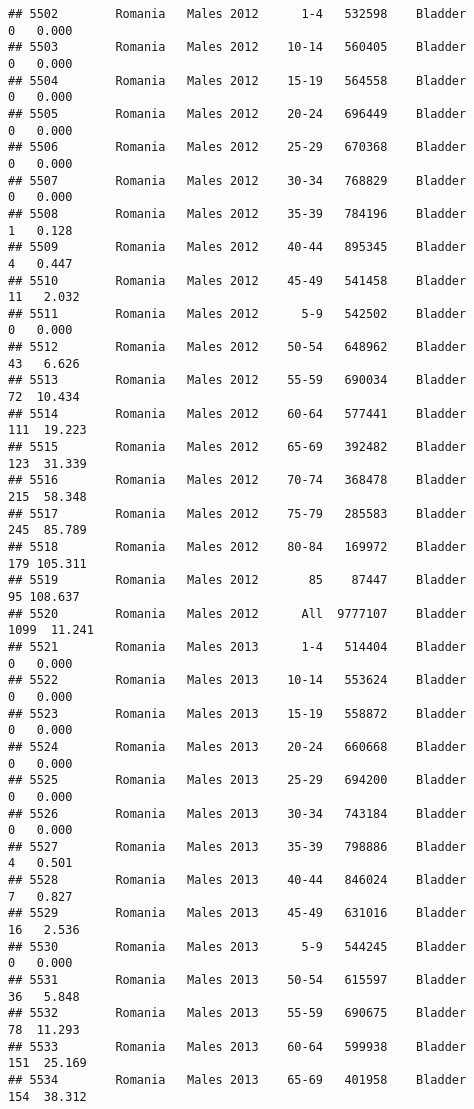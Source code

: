 \documentclass[
]{article}
\begin{document}
\begin{verbatim}
## 5502        Romania   Males 2012      1-4   532598    Bladder      0   0.000
## 5503        Romania   Males 2012    10-14   560405    Bladder      0   0.000
## 5504        Romania   Males 2012    15-19   564558    Bladder      0   0.000
## 5505        Romania   Males 2012    20-24   696449    Bladder      0   0.000
## 5506        Romania   Males 2012    25-29   670368    Bladder      0   0.000
## 5507        Romania   Males 2012    30-34   768829    Bladder      0   0.000
## 5508        Romania   Males 2012    35-39   784196    Bladder      1   0.128
## 5509        Romania   Males 2012    40-44   895345    Bladder      4   0.447
## 5510        Romania   Males 2012    45-49   541458    Bladder     11   2.032
## 5511        Romania   Males 2012      5-9   542502    Bladder      0   0.000
## 5512        Romania   Males 2012    50-54   648962    Bladder     43   6.626
## 5513        Romania   Males 2012    55-59   690034    Bladder     72  10.434
## 5514        Romania   Males 2012    60-64   577441    Bladder    111  19.223
## 5515        Romania   Males 2012    65-69   392482    Bladder    123  31.339
## 5516        Romania   Males 2012    70-74   368478    Bladder    215  58.348
## 5517        Romania   Males 2012    75-79   285583    Bladder    245  85.789
## 5518        Romania   Males 2012    80-84   169972    Bladder    179 105.311
## 5519        Romania   Males 2012       85    87447    Bladder     95 108.637
## 5520        Romania   Males 2012      All  9777107    Bladder   1099  11.241
## 5521        Romania   Males 2013      1-4   514404    Bladder      0   0.000
## 5522        Romania   Males 2013    10-14   553624    Bladder      0   0.000
## 5523        Romania   Males 2013    15-19   558872    Bladder      0   0.000
## 5524        Romania   Males 2013    20-24   660668    Bladder      0   0.000
## 5525        Romania   Males 2013    25-29   694200    Bladder      0   0.000
## 5526        Romania   Males 2013    30-34   743184    Bladder      0   0.000
## 5527        Romania   Males 2013    35-39   798886    Bladder      4   0.501
## 5528        Romania   Males 2013    40-44   846024    Bladder      7   0.827
## 5529        Romania   Males 2013    45-49   631016    Bladder     16   2.536
## 5530        Romania   Males 2013      5-9   544245    Bladder      0   0.000
## 5531        Romania   Males 2013    50-54   615597    Bladder     36   5.848
## 5532        Romania   Males 2013    55-59   690675    Bladder     78  11.293
## 5533        Romania   Males 2013    60-64   599938    Bladder    151  25.169
## 5534        Romania   Males 2013    65-69   401958    Bladder    154  38.312

\end{verbatim}
\end{document}
